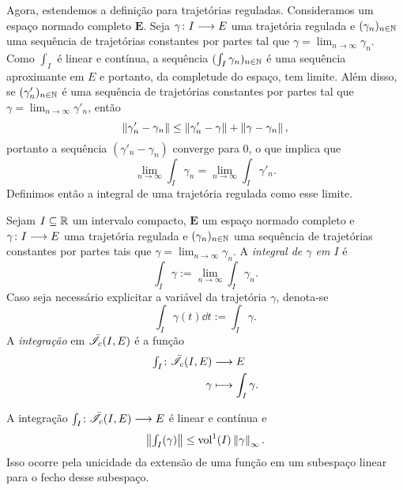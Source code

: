 Agora, estendemos a definição para trajetórias reguladas. Consideramos um espaço normado completo $\bm E$. Seja $\gamma\colon \allowbreak I \longrightarrow E$ uma trajetória regulada e $(\gamma_n)_{n \in \mathbb{N}}$ uma sequência de trajetórias constantes por partes tal que $\gamma = \lim_{n \to \infty} \gamma_n$. Como $\int_I$ é linear e contínua, a sequência $(\int_I \gamma_n)_{n \in \mathbb{N}}$ é uma sequência aproximante em $E$ e portanto, da completude do espaço, tem limite. Além disso, se $(\gamma'_n)_{n \in \mathbb{N}}$ é uma sequência de trajetórias constantes por partes tal que $\gamma = \lim_{n \to \infty} \gamma'_n$, então
	\begin{equation*}
	\left\Vert{\gamma'_n - \gamma_n}\right\Vert \leq \left\Vert{\gamma'_n - \gamma}\right\Vert + \left\Vert{\gamma - \gamma_n}\right\Vert,
	\end{equation*}
portanto a sequência $(\gamma'_n - \gamma_n)$ converge para $0$, o que implica que%
	\begin{equation*}
	\lim_{n \to \infty} \int_I \gamma_n = \lim_{n \to \infty} \int_I \gamma'_n.
	\end{equation*}
Definimos então a integral de uma trajetória regulada como esse limite.

\begin{definition}[Integração]
Sejam $I \subseteq \mathbb{R}$ um intervalo compacto, $\bm E$ um espaço normado completo e $\gamma\colon \allowbreak I \longrightarrow E$ uma trajetória regulada e $(\gamma_n)_{n \in \mathbb{N}}$ uma sequência de trajetórias constantes por partes tais que $\gamma = \lim_{n \to \infty} \gamma_n$.
A \emph{integral de $\gamma$ em $I$} é
	\begin{equation*}
	\int_I \gamma := \lim_{n \to \infty} \int_I \gamma_n.
	\end{equation*}
Caso seja necessário explicitar a variável da trajetória $\gamma$, denota-se
	\begin{equation*}
	\int_I \gamma(t) \dd t := \int_I \gamma.
	\end{equation*}
A \emph{integração} em $\bar{\mathscr{I}}_{c}(I,E)$ é a função
	\begin{align*}
	{\textstyle\int_I}\colon {\bar{\mathscr{I}}_{c}(I,E)} &\longrightarrow {E} \\{\gamma} &\longmapsto \int_I \gamma.
	\end{align*}
\end{definition}

A integração $\int_I\colon \allowbreak \bar{\mathscr{I}}_{c}(I,E) \longrightarrow E$ é linear e contínua e
	\begin{equation*}
	\left\Vert{\textstyle\int_I(\gamma)}\right\Vert \leq \operatorname{vol}^1(I) \left\Vert{\gamma}\right\Vert_{\infty}.
	\end{equation*}
Isso ocorre pela unicidade da extensão de uma função em um subespaço linear para o fecho desse subespaço.

